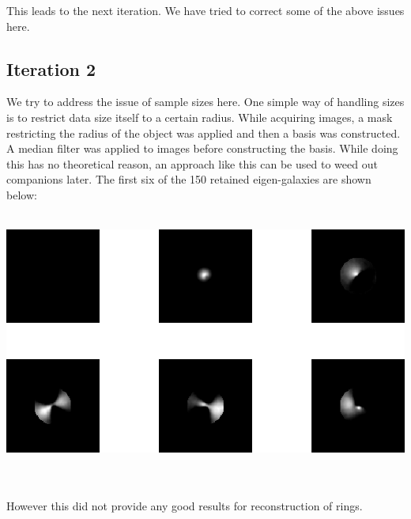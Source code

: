\documentclass[11pt, a4paper]{article}
\begin{document}
This leads to the next iteration. We have tried to correct some of the above issues here.

\subsection{Iteration 2}
We try to address the issue of sample sizes here. One simple way of handling sizes is to restrict data size itself to a certain radius. While acquiring images, a mask restricting the radius of the object was applied and then a basis was constructed. A median filter was applied to images before constructing the basis. While doing this has no theoretical reason, an approach like this can be used to weed out companions later. The first six of the 150 retained eigen-galaxies are shown below:\\ \\
\centerline{\includegraphics[scale=0.5]{aperture_limited_basis.png}} \\ \\
However this did not provide any good results for reconstruction of rings.
\end{document}
